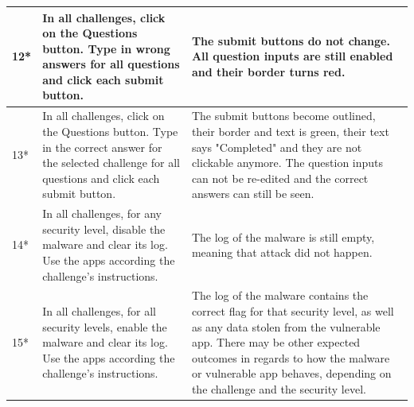 \begin{center}
\begin{longtable}{|p{0.4cm} |p{5.2cm} |p{7.4cm} |}
         \hline
         12* & In all challenges, click on the Questions button. Type in wrong answers for all questions and click each submit button. & The submit buttons do not change. All question inputs are still enabled and their border turns red. \\
         \hline
         13* & In all challenges, click on the Questions button. Type in the correct answer for the selected challenge for all questions and click each submit button. & The submit buttons become outlined, their border and text is green, their text says "Completed" and they are not clickable anymore. The question inputs can not be re-edited and the correct answers can still be seen. \\
         \hline
         14* & In all challenges, for any security level, disable the malware and clear its log. Use the apps according the challenge's instructions. & The log of the malware is still empty, meaning that attack did not happen. \\
         \hline
         15* & In all challenges, for all security levels, enable the malware and clear its log. Use the apps according the challenge's instructions. & The log of the malware contains the correct flag for that security level, as well as any data stolen from the vulnerable app. There may be other expected outcomes in regards to how the malware or vulnerable app behaves, depending on the challenge and the security level.\\
         \hline

        \end{longtable}
    \end{center}
    